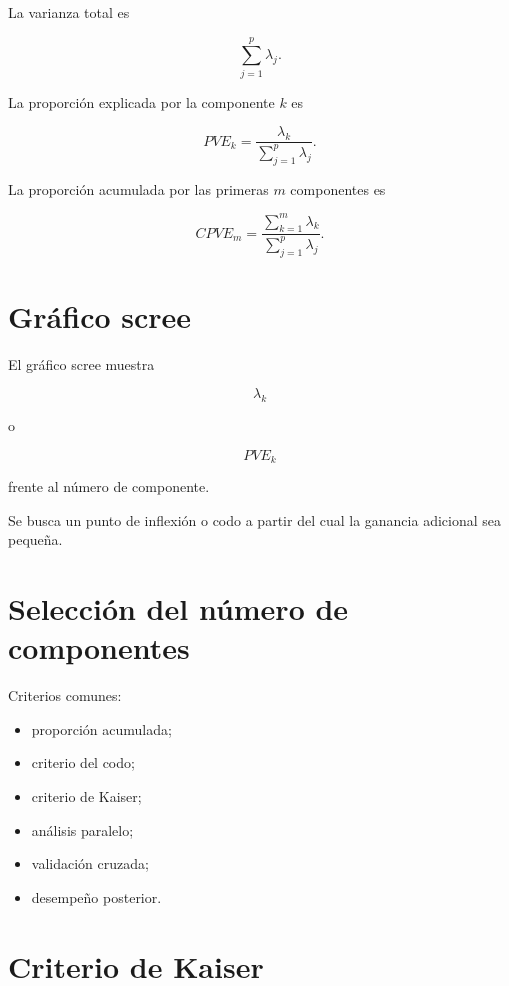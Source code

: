 \documentclass[
  spanish,
  10.5pt,
  letterpaper,
  DIV=11,
  numbers=noendperiod,
  oneside,
  open=any]{scrreprt}
\providecommand{\tightlist}{%
  \setlength{\itemsep}{0pt}\setlength{\parskip}{0pt}}
\theoremstyle{definition}
\theoremstyle{definition}
\theoremstyle{plain}
\theoremstyle{remark}
\begin{document}

La varianza total es

\[
\sum_{j=1}^{p}\lambda_j.
\]

La proporción explicada por la componente \(k\) es

\[
PVE_k
=
\frac{\lambda_k}
{\sum_{j=1}^{p}\lambda_j}.
\]

La proporción acumulada por las primeras \(m\) componentes es

\[
CPVE_m
=
\frac{
\sum_{k=1}^{m}\lambda_k
}{
\sum_{j=1}^{p}\lambda_j
}.
\]

\section*{Gráfico scree}\label{gruxe1fico-scree}


El gráfico scree muestra

\[
\lambda_k
\]

o

\[
PVE_k
\]

frente al número de componente.

Se busca un punto de inflexión o codo a partir del cual la ganancia
adicional sea pequeña.

\section*{Selección del número de
componentes}\label{selecciuxf3n-del-nuxfamero-de-componentes}


Criterios comunes:

\begin{itemize}
\tightlist
\item
  proporción acumulada;
\item
  criterio del codo;
\item
  criterio de Kaiser;
\item
  análisis paralelo;
\item
  validación cruzada;
\item
  desempeño posterior.
\end{itemize}

\section*{Criterio de Kaiser}\label{criterio-de-kaiser}
\end{document}
